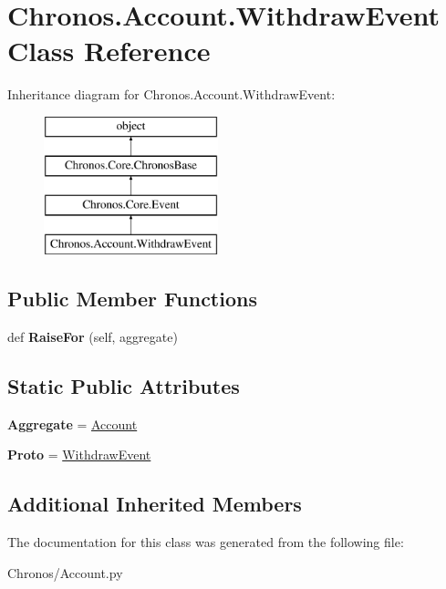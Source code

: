 \hypertarget{classChronos_1_1Account_1_1WithdrawEvent}{}\section{Chronos.\+Account.\+Withdraw\+Event Class Reference}
\label{classChronos_1_1Account_1_1WithdrawEvent}
Inheritance diagram for Chronos.\+Account.\+Withdraw\+Event\+:\begin{figure}[H]
\begin{center}
\leavevmode
\includegraphics[height=4.000000cm]{classChronos_1_1Account_1_1WithdrawEvent}
\end{center}
\end{figure}
\subsection*{Public Member Functions}
\begin{DoxyCompactItemize}
\item 
def {\bfseries Raise\+For} (self, aggregate)\hypertarget{classChronos_1_1Account_1_1WithdrawEvent_a562004e3a174de0589605b5a7130820b}{}\label{classChronos_1_1Account_1_1WithdrawEvent_a562004e3a174de0589605b5a7130820b}

\end{DoxyCompactItemize}
\subsection*{Static Public Attributes}
\begin{DoxyCompactItemize}
\item 
{\bfseries Aggregate} = \hyperlink{classChronos_1_1Account_1_1Account}{Account}\hypertarget{classChronos_1_1Account_1_1WithdrawEvent_a38b05fdfb69a2e6cdf5458277a9343af}{}\label{classChronos_1_1Account_1_1WithdrawEvent_a38b05fdfb69a2e6cdf5458277a9343af}

\item 
{\bfseries Proto} = \hyperlink{classChronos_1_1Account_1_1WithdrawEvent}{Withdraw\+Event}\hypertarget{classChronos_1_1Account_1_1WithdrawEvent_a2f6149c36851358e326829caf1f5d077}{}\label{classChronos_1_1Account_1_1WithdrawEvent_a2f6149c36851358e326829caf1f5d077}

\end{DoxyCompactItemize}
\subsection*{Additional Inherited Members}


The documentation for this class was generated from the following file\+:\begin{DoxyCompactItemize}
\item 
Chronos/Account.\+py\end{DoxyCompactItemize}
